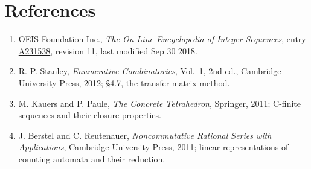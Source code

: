 \documentclass[11pt]{article}
\theoremstyle{definition}
\begin{document}
\section{References}

\begin{enumerate}

\item OEIS Foundation Inc., \emph{The On-Line Encyclopedia of Integer Sequences}, entry \href{https://oeis.org/A231538}{A231538}, revision 11, last modified Sep 30 2018.

\item R. P. Stanley, \emph{Enumerative Combinatorics}, Vol.~1, 2nd ed., Cambridge University Press, 2012; \S4.7, the transfer-matrix method.

\item M. Kauers and P. Paule, \emph{The Concrete Tetrahedron}, Springer, 2011; C-finite sequences and their closure properties.

\item J. Berstel and C. Reutenauer, \emph{Noncommutative Rational Series with Applications}, Cambridge University Press, 2011; linear representations of counting automata and their reduction.

\end{enumerate}
\end{document}
